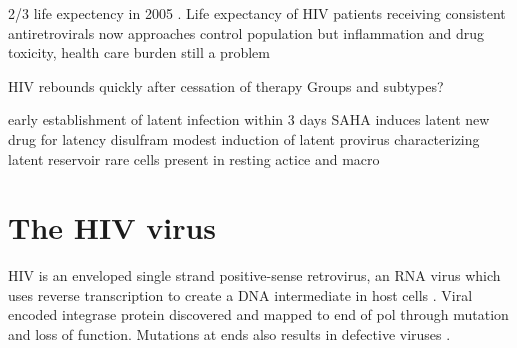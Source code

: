 \documentclass[../sherrill-Mix_thesis.tex]{subfiles}
\begin{document}
	2/3 life expectency in 2005 \citep{ATCC2008,Keiser2004}. Life expectancy of HIV patients receiving consistent antiretrovirals now approaches control population \citep{vanSighem2010,Nakagawa2013,Johnson2013} but inflammation and drug toxicity, health care burden still a problem \citep{Deeks2013}


	HIV rebounds quickly after cessation of therapy \citep{Cillo2014}
	Groups and subtypes?

	early establishment of latent infection \citep{Chun1998a} within 3 days \citep{Whitney2014}
	SAHA induces latent \citep{Contreras2009}
	new drug for latency disulfram \citep{Xing2011}
	modest induction of latent provirus \citep{Cillo2014}
	characterizing latent reservoir rare cells present in resting actice and macro \citep{Chun1997}


	





\section{The HIV virus}
HIV is an enveloped single strand positive-sense retrovirus, an RNA virus which uses reverse transcription to create a DNA intermediate in host cells \citep{Baltimore1970,Temin1970}. Viral encoded integrase protein discovered \citep{Grandgenett1978} and mapped to \threePrime{} end of pol \citep{Panganiban1984,Schwartzberg1984,Donehower1984} through mutation and loss of function.  Mutations at ends also results in defective viruses \citep{Panganiban1983}.
\end{document}
